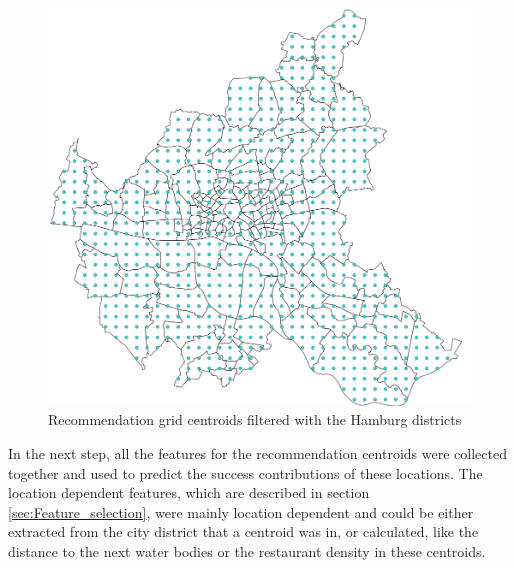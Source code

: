 \documentclass[a4paper, 11pt, oneside]{Thesis}  %
\begin{document}
\begin{figure}[h]
\includegraphics[scale=0.7]{Figures/Recommendation_map/Recommendation_Grid_Centroids_reduced.png}
\centering
\caption{Recommendation grid centroids filtered with the Hamburg districts}
\label{fig:Recommendation_Grid_Centroids_reduced}
\end{figure}

In the next step, all the features for the recommendation centroids were collected together and used to predict the success contributions of these locations. The location dependent features, which are described in section \ref{sec:Feature_selection}, were mainly location dependent and could be either extracted from the city district that a centroid was in, or calculated, like the distance to the next water bodies or the restaurant density in these centroids.
\end{document}
